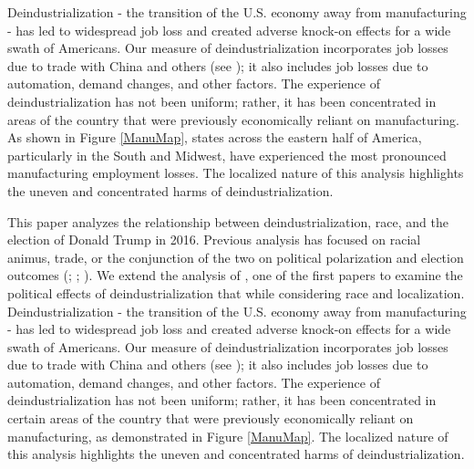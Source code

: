 \documentclass[]{AEA}
\begin{document}
Deindustrialization - the transition of the U.S. economy away from
manufacturing - has led to widespread job loss and created adverse
knock-on effects for a wide swath of Americans. Our measure of
deindustrialization incorporates job losses due to trade with China and
others (see \cite{Acemoglu16}); it also includes job losses due to
automation, demand changes, and other factors. The experience of
deindustrialization has not been uniform; rather, it has been
concentrated in areas of the country that were previously economically
reliant on manufacturing. As shown in Figure \ref{ManuMap}, states
across the eastern half of America, particularly in the South and
Midwest, have experienced the most pronounced manufacturing employment
losses. The localized nature of this analysis highlights the uneven and
concentrated harms of deindustrialization.

This paper analyzes the relationship between deindustrialization, race,
and the election of Donald Trump in 2016. Previous analysis has focused
on racial animus, trade, or the conjunction of the two on political
polarization and election outcomes (\cite{Autor20}; \cite{Che16};
\cite{BR21}). We extend the analysis of \cite{Baccini21}, one of the
first papers to examine the political effects of deindustrialization
that while considering race and localization. Deindustrialization - the
transition of the U.S. economy away from manufacturing - has led to
widespread job loss and created adverse knock-on effects for a wide
swath of Americans. Our measure of deindustrialization incorporates job
losses due to trade with China and others (see \cite{Acemoglu16}); it
also includes job losses due to automation, demand changes, and other
factors. The experience of deindustrialization has not been uniform;
rather, it has been concentrated in certain areas of the country that
were previously economically reliant on manufacturing, as demonstrated
in Figure \ref{ManuMap}. The localized nature of this analysis
highlights the uneven and concentrated harms of deindustrialization.
\end{document}
